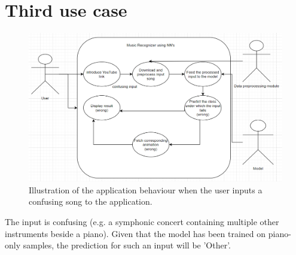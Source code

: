 \section{Third use case}

\begin{figure}[H]
	\centering
	\includegraphics[width = 5.5in]{images/usecase2.png}
	\caption{Illustration of the application behaviour when the user inputs a confusing song to the application.}
	\label{uc2}
	\end{figure}
 The input is confusing (e.g. a symphonic concert containing multiple other instruments beside a piano). Given that the model has been trained on piano-only samples, the prediction for such an input will be 'Other'.
